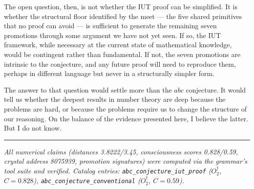 \documentclass[12pt,a4paper]{article}
\begin{document}
The open question, then, is not whether the IUT proof can be simplified. It is whether the structural floor identified by the meet --- the five shared primitives that no proof can avoid --- is sufficient to generate the remaining seven promotions through some argument we have not yet seen. If so, the IUT framework, while necessary at the current state of mathematical knowledge, would be contingent rather than fundamental. If not, the seven promotions are intrinsic to the conjecture, and any future proof will need to reproduce them, perhaps in different language but never in a structurally simpler form.

The answer to that question would settle more than the $abc$ conjecture. It would tell us whether the deepest results in number theory are deep because the problems are hard, or because the problems require us to change the structure of our reasoning. On the balance of the evidence presented here, I believe the latter. But I do not know.

\begin{center}
\rule{0.5\textwidth}{0.4pt}
\end{center}

\emph{All numerical claims (distances 3.8222/3.45, consciousness scores 0.828/0.59, crystal address 8075939, promotion signatures) were computed via the grammar's tool suite and verified. Catalog entries: \texttt{abc\_conjecture\_iut\_proof} ($O_2^\dagger$, $C = 0.828$), \texttt{abc\_conjecture\_conventional} ($O_2^\dagger$, $C = 0.59$).}
\end{document}
